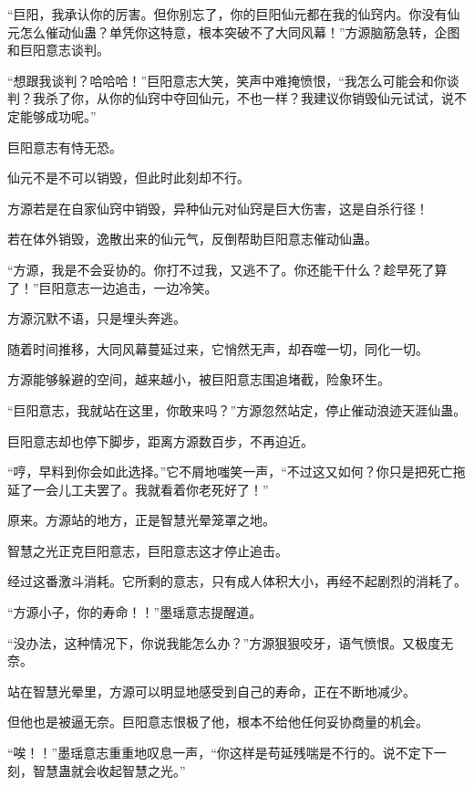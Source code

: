 
\begin{this_body}

“巨阳，我承认你的厉害。但你别忘了，你的巨阳仙元都在我的仙窍内。你没有仙元怎么催动仙蛊？单凭你这特意，根本突破不了大同风幕！”方源脑筋急转，企图和巨阳意志谈判。

“想跟我谈判？哈哈哈！”巨阳意志大笑，笑声中难掩愤恨，“我怎么可能会和你谈判？我杀了你，从你的仙窍中夺回仙元，不也一样？我建议你销毁仙元试试，说不定能够成功呢。”

巨阳意志有恃无恐。

仙元不是不可以销毁，但此时此刻却不行。

方源若是在自家仙窍中销毁，异种仙元对仙窍是巨大伤害，这是自杀行径！

若在体外销毁，逸散出来的仙元气，反倒帮助巨阳意志催动仙蛊。

“方源，我是不会妥协的。你打不过我，又逃不了。你还能干什么？趁早死了算了！”巨阳意志一边追击，一边冷笑。

方源沉默不语，只是埋头奔逃。

随着时间推移，大同风幕蔓延过来，它悄然无声，却吞噬一切，同化一切。

方源能够躲避的空间，越来越小，被巨阳意志围追堵截，险象环生。

“巨阳意志，我就站在这里，你敢来吗？”方源忽然站定，停止催动浪迹天涯仙蛊。

巨阳意志却也停下脚步，距离方源数百步，不再迫近。

“哼，早料到你会如此选择。”它不屑地嗤笑一声，“不过这又如何？你只是把死亡拖延了一会儿工夫罢了。我就看着你老死好了！”

原来。方源站的地方，正是智慧光晕笼罩之地。

智慧之光正克巨阳意志，巨阳意志这才停止追击。

经过这番激斗消耗。它所剩的意志，只有成人体积大小，再经不起剧烈的消耗了。

“方源小子，你的寿命！！”墨瑶意志提醒道。

“没办法，这种情况下，你说我能怎么办？”方源狠狠咬牙，语气愤恨。又极度无奈。

站在智慧光晕里，方源可以明显地感受到自己的寿命，正在不断地减少。

但他也是被逼无奈。巨阳意志恨极了他，根本不给他任何妥协商量的机会。

“唉！！”墨瑶意志重重地叹息一声，“你这样是苟延残喘是不行的。说不定下一刻，智慧蛊就会收起智慧之光。”


\end{this_body}
